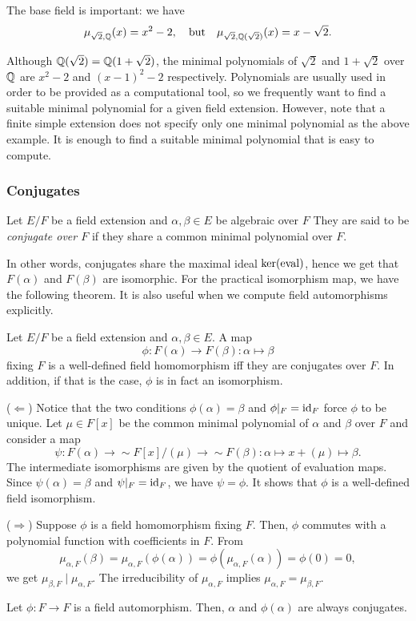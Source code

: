 \documentclass{../exp}
\begin{document}
\begin{ex}
The base field is important: we have
\[\mu_{\sqrt2,\mathbb{Q}}(x)=x^2-2,\quad\text{but}\quad\mu_{\sqrt2,\mathbb{Q}(\sqrt2)}(x)=x-\sqrt2.\]
\end{ex}

\begin{ex}
Although $\mathbb{Q}(\sqrt2)=\mathbb{Q}(1+\sqrt2)$, the minimal polynomials of $\sqrt2$ and $1+\sqrt2$ over $\mathbb{Q}$ are $x^2-2$ and $(x-1)^2-2$ respectively.
Polynomials are usually used in order to be provided as a computational tool, so we frequently want to find a suitable minimal polynomial for a given field extension.
However, note that a finite simple extension does not specify only one minimal polynomial as the above example.
It is enough to find a suitable minimal polynomial that is easy to compute.
\end{ex}

\subsubsection{Conjugates}

\begin{defn}
Let $E/F$ be a field extension and $\alpha,\beta\in E$ be algebraic over $F$
They are said to be \emph{conjugate over $F$} if they share a common minimal polynomial over $F$.
\end{defn}

In other words, conjugates share the maximal ideal $\ker(\operatorname{eval})$, hence we get that $F(\alpha)$ and $F(\beta)$ are isomorphic.
For the practical isomorphism map, we have the following theorem.
It is also useful when we compute field automorphisms explicitly.

\begin{thm}
Let $E/F$ be a field extension and $\alpha,\beta\in E$.
A map
\[\phi:F(\alpha)\to F(\beta):\alpha\mapsto\beta\]
fixing $F$ is a well-defined field homomorphism iff they are conjugates over $F$.
In addition, if that is the case, $\phi$ is in fact an isomorphism.
\end{thm}
\begin{pf}
($\Leftarrow$)
Notice that the two conditions $\phi(\alpha)=\beta$ and $\phi|_F=\operatorname{id}_F$ force $\phi$ to be unique.
Let $\mu\in F[x]$ be the common minimal polynomial of $\alpha$ and $\beta$ over $F$ and consider a map
\[\psi:F(\alpha)\to{\sim}F[x]/(\mu)\to{\sim}F(\beta):\alpha\mapsto x+(\mu)\mapsto\beta.\]
The intermediate isomorphisms are given by the quotient of evaluation maps.
Since $\psi(\alpha)=\beta$ and $\psi|_F=\operatorname{id}_F$, we have $\psi=\phi$.
It shows that $\phi$ is a well-defined field isomorphism.

($\Rightarrow$)
Suppose $\phi$ is a field homomorphism fixing $F$.
Then, $\phi$ commutes with a polynomial function with coefficients in $F$.
From
\[\mu_{\alpha,F}(\beta)=\mu_{\alpha,F}(\phi(\alpha))=\phi(\mu_{\alpha,F}(\alpha))=\phi(0)=0,\]
we get $\mu_{\beta,F}\mid\mu_{\alpha,F}$.
The irreducibility of $\mu_{\alpha,F}$ implies $\mu_{\alpha,F}=\mu_{\beta,F}$.
\end{pf}
\begin{cor}
Let $\phi:F\to F$ is a field automorphism.
Then, $\alpha$ and $\phi(\alpha)$ are always conjugates.
\end{cor}
\end{document}
